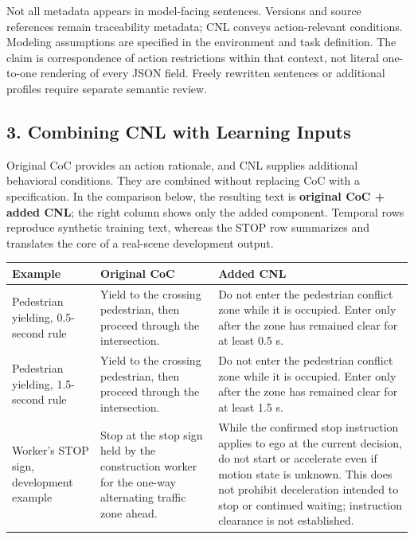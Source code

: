 \documentclass[11pt,a4paper]{article}
\begin{document}
Not all metadata appears in model-facing sentences. Versions and source references remain traceability metadata; CNL conveys action-relevant conditions. Modeling assumptions are specified in the environment and task definition. The claim is correspondence of action restrictions within that context, not literal one-to-one rendering of every JSON field. Freely rewritten sentences or additional profiles require separate semantic review.\par

\subsection*{3. Combining CNL with Learning Inputs}

Original CoC provides an action rationale, and CNL supplies additional behavioral conditions. They are combined without replacing CoC with a specification. In the comparison below, the resulting text is \textbf{original CoC + added CNL}; the right column shows only the added component. Temporal rows reproduce synthetic training text, whereas the STOP row summarizes and translates the core of a real-scene development output.\par

\par\medskip\noindent\begin{minipage}{\linewidth}\small
\begin{tabular}{@{}>{\raggedright\arraybackslash}p{}>{\raggedright\arraybackslash}p{}>{\raggedright\arraybackslash}p{}@{}}
\toprule
\textbf{Example} & \textbf{Original CoC} & \textbf{Added CNL} \\
\midrule
Pedestrian yielding, 0.5-second rule & Yield to the crossing pedestrian, then proceed through the intersection. & Do not enter the pedestrian conflict zone while it is occupied. Enter only after the zone has remained clear for at least 0.5 s. \\
Pedestrian yielding, 1.5-second rule & Yield to the crossing pedestrian, then proceed through the intersection. & Do not enter the pedestrian conflict zone while it is occupied. Enter only after the zone has remained clear for at least 1.5 s. \\
Worker's STOP sign, development example & Stop at the stop sign held by the construction worker for the one-way alternating traffic zone ahead. & While the confirmed stop instruction applies to ego at the current decision, do not start or accelerate even if motion state is unknown. This does not prohibit deceleration intended to stop or continued waiting; instruction clearance is not established. \\
\bottomrule\end{tabular}\end{minipage}\par\medskip
\end{document}
